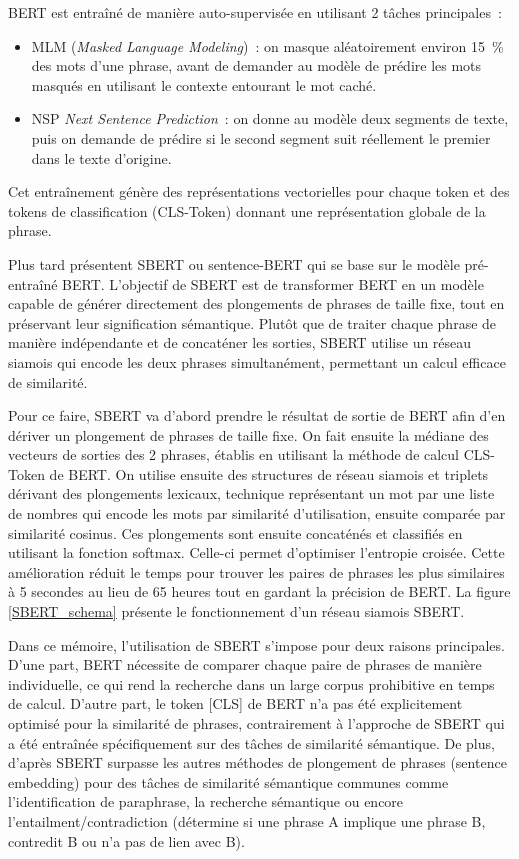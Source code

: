 BERT est entraîné de manière auto-supervisée en utilisant 2 tâches principales~:
\begin{itemize}
    \item MLM (\textit{Masked Language Modeling})~: on masque aléatoirement environ 15~\% des mots d’une phrase,
    avant de demander au modèle de prédire les mots masqués en utilisant le contexte entourant le mot caché.
    \item NSP {\textit{Next Sentence Prediction}}~: on donne au modèle deux segments de texte, puis on demande de
    prédire si le second segment suit réellement le premier dans le texte d’origine.
\end{itemize}
Cet entraînement génère des représentations vectorielles pour chaque token et des tokens de classification (CLS-Token)
donnant une représentation globale de la phrase.

Plus tard \citet{reimers_2019} présentent SBERT ou sentence-BERT qui se base sur le modèle pré-entraîné
BERT. L'objectif de SBERT est de transformer BERT en un modèle capable de générer directement des plongements
de phrases de taille fixe, tout en préservant leur signification sémantique. Plutôt que de traiter
chaque phrase de manière indépendante et de concaténer les sorties, SBERT utilise un réseau siamois
qui encode les deux phrases simultanément, permettant un calcul efficace de similarité.

Pour ce faire, SBERT va d'abord prendre le résultat de sortie de BERT afin d'en dériver un plongement de phrases de taille
fixe. On fait ensuite la médiane des vecteurs de sorties des 2 phrases, établis en utilisant la méthode de calcul
CLS-Token de BERT. On utilise ensuite des structures de \gls{réseau siamois} et triplets
dérivant des \gls{plongements lexicaux}, technique représentant un mot par une liste de nombres
qui encode les mots par similarité d'utilisation, ensuite comparée par \gls{similarité cosinus}.
Ces plongements sont ensuite concaténés et classifiés en utilisant la fonction softmax.
Celle-ci permet d'optimiser l'entropie croisée. Cette amélioration réduit le temps pour trouver les paires de phrases les plus
similaires à 5 secondes au lieu de {65 heures} tout en gardant la précision de BERT. La figure \ref{SBERT_schema} présente le fonctionnement
d'un réseau siamois SBERT.

Dans ce mémoire, l'utilisation de SBERT s'impose pour deux raisons principales. D'une part, BERT
nécessite de comparer chaque paire de phrases de manière individuelle, ce qui rend la recherche
dans un large corpus prohibitive en temps de calcul. D'autre part, le token [CLS] de BERT n'a pas
été explicitement optimisé pour la similarité de phrases, contrairement à l'approche de SBERT qui
a été entraînée spécifiquement sur des tâches de similarité sémantique.
De plus, d'après \citet{reimers_2019} SBERT surpasse les autres méthodes de \gls{plongement de phrases} (sentence embedding)
pour des tâches de similarité sémantique communes comme l'identification de paraphrase, la recherche sémantique
ou encore l'entailment/contradiction (détermine si une phrase A implique une phrase B, contredit B
ou n'a pas de lien avec B).

